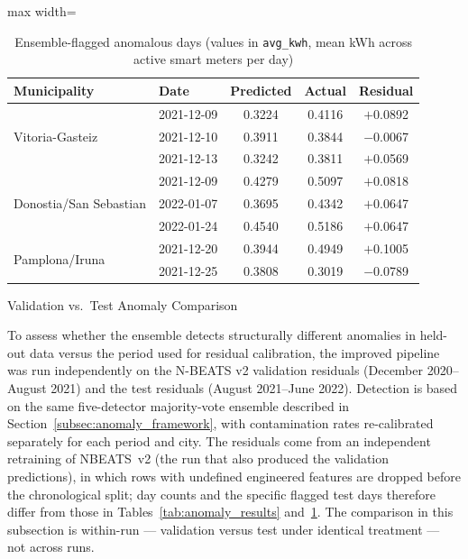 ﻿\documentclass[12pt,reqno, twoside]{amsbook}
\makeatletter
\numberwithin{figure}{chapter}
\numberwithin{table}{chapter}
\numberwithin{equation}{chapter}
\def\subsection{\@startsection{subsection}{2}%
      \z@{.5\linespacing\@plus.7\linespacing}{.25\linespacing}%
      {\normalfont\bfseries\flushleft}}
\theoremstyle{plain}
\numberwithin{equation}{chapter}
\numberwithin{section}{chapter}
\makeatother
\begin{document}
\begin{table}[htbp]
\centering
\caption{Ensemble-flagged anomalous days (values in \texttt{avg\_kwh}, mean kWh across active smart meters per day)}
\label{tab:anomaly_days}
\begin{adjustbox}{max width=\textwidth}
\begin{tabular}{llccc}
\toprule
\textbf{Municipality} & \textbf{Date} & \textbf{Predicted} & \textbf{Actual} & \textbf{Residual} \\
\midrule
\multirow{3}{*}{Vitoria-Gasteiz}
  & 2021-12-09 & 0.3224 & 0.4116 & $+$0.0892 \\
  & 2021-12-10 & 0.3911 & 0.3844 & $-$0.0067 \\
  & 2021-12-13 & 0.3242 & 0.3811 & $+$0.0569 \\
\midrule
\multirow{3}{*}{Donostia/San Sebastian}
  & 2021-12-09 & 0.4279 & 0.5097 & $+$0.0818 \\
  & 2022-01-07 & 0.3695 & 0.4342 & $+$0.0647 \\
  & 2022-01-24 & 0.4540 & 0.5186 & $+$0.0647 \\
\midrule
\multirow{2}{*}{Pamplona/Iruna}
  & 2021-12-20 & 0.3944 & 0.4949 & $+$0.1005 \\
  & 2021-12-25 & 0.3808 & 0.3019 & $-$0.0789 \\
\bottomrule
\end{tabular}
\end{adjustbox}
\end{table}

\FloatBarrier

\subsection{Validation vs.\ Test Anomaly Comparison}
\label{subsec:anomaly_val_test}

To assess whether the ensemble detects structurally different anomalies in held-out data versus the period used for residual calibration, the improved pipeline was run independently on the N-BEATS v2 validation residuals (December 2020--August 2021) and the test residuals (August 2021--June 2022). Detection is based on the same five-detector majority-vote ensemble described in Section~\ref{subsec:anomaly_framework}, with contamination rates re-calibrated separately for each period and city. The residuals come from an independent retraining of \ac{NBEATS}~v2 (the run that also produced the validation predictions), in which rows with undefined engineered features are dropped before the chronological split; day counts and the specific flagged test days therefore differ from those in Tables~\ref{tab:anomaly_results} and~\ref{tab:anomaly_days}. The comparison in this subsection is within-run --- validation versus test under identical treatment --- not across runs.
\end{document}
